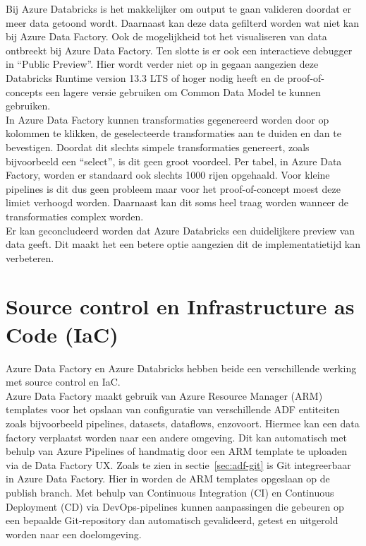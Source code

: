 Bij Azure Databricks is het makkelijker om output te gaan valideren doordat er meer data getoond wordt. Daarnaast kan deze data gefilterd worden wat niet kan bij Azure Data Factory. Ook de mogelijkheid tot het visualiseren van data ontbreekt bij Azure Data Factory. Ten slotte is er ook een interactieve debugger in ``Public Preview''. Hier wordt verder niet op in gegaan aangezien deze Databricks Runtime version 13.3 LTS of hoger nodig heeft en de proof-of-concepts een lagere versie gebruiken om Common Data Model te kunnen gebruiken.\\

In Azure Data Factory kunnen transformaties gegenereerd worden door op kolommen te klikken, de geselecteerde transformaties aan te duiden en dan te bevestigen. Doordat dit slechts simpele transformaties genereert, zoals bijvoorbeeld een ``select'', is dit geen groot voordeel. Per tabel, in Azure Data Factory, worden er standaard ook slechts 1000 rijen opgehaald. Voor kleine pipelines is dit dus geen probleem maar voor het proof-of-concept moest deze limiet verhoogd worden. Daarnaast kan dit soms heel traag worden wanneer de transformaties complex worden.\\

Er kan geconcludeerd worden dat Azure Databricks een duidelijkere preview van data geeft. Dit maakt het een betere optie aangezien dit de implementatietijd kan verbeteren.

\section{Source control en Infrastructure as Code (IaC)}

Azure Data Factory en Azure Databricks hebben beide een verschillende werking met source control en IaC.\\

Azure Data Factory maakt gebruik van Azure Resource Manager (ARM) templates voor het opslaan van configuratie van verschillende ADF entiteiten zoals bijvoorbeeld pipelines, datasets, dataflows, enzovoort. Hiermee kan een data factory verplaatst worden naar een andere omgeving. Dit kan automatisch met behulp van Azure Pipelines of handmatig door een ARM template te uploaden via de Data Factory UX. Zoals te zien in sectie~\ref{sec:adf-git} is Git integreerbaar in Azure Data Factory. Hier in worden de ARM templates opgeslaan op de publish branch. Met behulp van Continuous Integration (CI) en Continuous Deployment (CD) via DevOps-pipelines kunnen aanpassingen die gebeuren op een bepaalde Git-repository dan automatisch gevalideerd, getest en uitgerold worden naar een doelomgeving.\\

